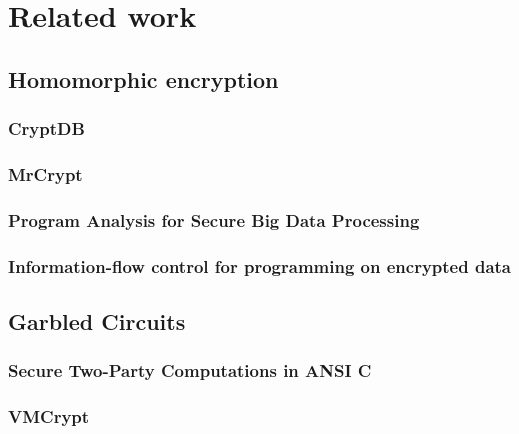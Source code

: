 \chapter{Related work}
\label{cha:related-work}

\section{Homomorphic encryption}
\label{sec:homom-encrypt}

\subsection{CryptDB}
\label{sec:cryptdb}

\cite{CryptDB}

\subsection{MrCrypt}
\label{sec:mrcrypt}

\cite{MrCrypt}

\subsection{Program Analysis for Secure Big Data Processing}
\label{sec:progr-analys-secure}

\cite{ProgramAnalysisBigData}

\subsection{Information-flow control for programming on encrypted data}
\label{sec:inform-flow-contr}

\cite{InfFlowEnc}

\section{Garbled Circuits}
\label{sec:garbled-circuits}

\subsection{Secure Two-Party Computations in ANSI C}
\label{sec:secure-two-party}

\cite{Secure2PartyC}

\subsection{VMCrypt}
\label{sec:vmcrypt}

